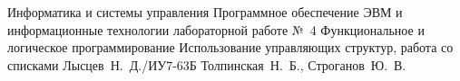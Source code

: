 \documentclass{bmstu}
\begin{document}
\makereporttitle
{Информатика и системы управления} %
{Программное обеспечение ЭВМ и информационные технологии}
{лабораторной работе №~4} %
{Функциональное и логическое программирование} %
{Использование управляющих структур, работа со списками} %
{} %
{Лысцев~Н.~Д./ИУ7-63Б} %
{Толпинская~Н.~Б., Строганов~Ю.~В.} %
{}


%

%
%
%

\end{document}

